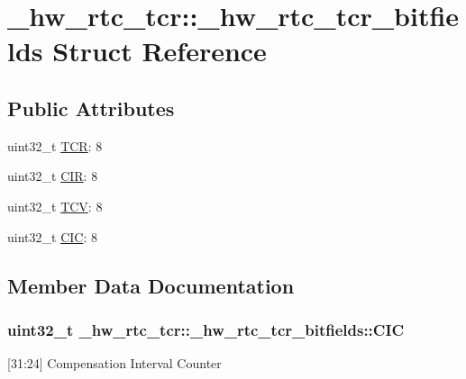 \hypertarget{struct__hw__rtc__tcr_1_1__hw__rtc__tcr__bitfields}{}\section{\+\_\+hw\+\_\+rtc\+\_\+tcr\+:\+:\+\_\+hw\+\_\+rtc\+\_\+tcr\+\_\+bitfields Struct Reference}
\label{struct__hw__rtc__tcr_1_1__hw__rtc__tcr__bitfields}
\subsection*{Public Attributes}
\begin{DoxyCompactItemize}
\item 
uint32\+\_\+t \hyperlink{struct__hw__rtc__tcr_1_1__hw__rtc__tcr__bitfields_ad0344be79119ecb6a52df9baca964052}{T\+CR}\+: 8
\item 
uint32\+\_\+t \hyperlink{struct__hw__rtc__tcr_1_1__hw__rtc__tcr__bitfields_a14af1426f7d4c5fb26ea7201e811b57d}{C\+IR}\+: 8
\item 
uint32\+\_\+t \hyperlink{struct__hw__rtc__tcr_1_1__hw__rtc__tcr__bitfields_a40b2f2c43fc1c3245ae1b55385d755b9}{T\+CV}\+: 8
\item 
uint32\+\_\+t \hyperlink{struct__hw__rtc__tcr_1_1__hw__rtc__tcr__bitfields_a04f0e63f6c8931e88d418749716d1922}{C\+IC}\+: 8
\end{DoxyCompactItemize}


\subsection{Member Data Documentation}
\subsubsection[{\texorpdfstring{C\+IC}{CIC}}]{\setlength{\rightskip}{0pt plus 5cm}uint32\+\_\+t \+\_\+hw\+\_\+rtc\+\_\+tcr\+::\+\_\+hw\+\_\+rtc\+\_\+tcr\+\_\+bitfields\+::\+C\+IC}\hypertarget{struct__hw__rtc__tcr_1_1__hw__rtc__tcr__bitfields_a04f0e63f6c8931e88d418749716d1922}{}\label{struct__hw__rtc__tcr_1_1__hw__rtc__tcr__bitfields_a04f0e63f6c8931e88d418749716d1922}
\mbox{[}31\+:24\mbox{]} Compensation Interval Counter 
